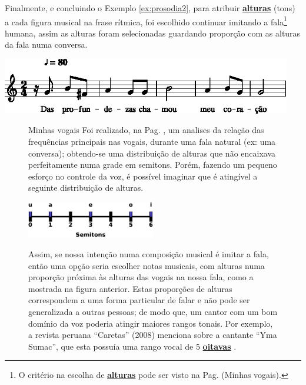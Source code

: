 \begin{example}
\label{ex:prosodia3}
Finalmente, e concluindo o Exemplo \ref{ex:prosodia2}, 
para atribuir \hyperref[sec:pos:Altura]{\textbf{alturas}} (tons) a cada figura musical na frase rítmica, 
foi escolhido continuar imitando a fala\footnote{O 
critério na escolha de \hyperref[sec:pos:Altura]{\textbf{alturas}} pode ser visto na Pag. \pageref{ref:minhasvogais} (Minhas vogais).}
humana,
assim as alturas foram selecionadas guardando proporção com as alturas da fala numa conversa.
\begin{center}
\href{https://drive.google.com/file/d/1LshTD9MsnL2LU70VyLBLKnlghprm0x8P/view?usp=sharing}{\includegraphics[width=0.95\textwidth]{chapters/cap-musica-topicos/frase5-1.eps}}
\end{center}
\end{example}

\begin{figure}[!ht]
\begin{elaboracion}{Minhas vogais}
Foi realizado, na Pag. \pageref{fig:timbresvocais}, um analises da relação das frequências principais nas vogais,
durante uma fala natural (ex: uma conversa);
obtendo-se uma distribuição de alturas que não encaixava perfeitamente numa grade em semitons.
Porém, fazendo um pequeno esforço no controle da voz, 
é possível imaginar que é atingível a seguinte distribuição de alturas.
\begin{center}
\includegraphics[width=0.50\textwidth]{chapters/cap-musica-topicos/vocales-semitons2.eps}
\end{center}
Assim, se nossa intenção numa composição musical é imitar a fala, 
então uma opção seria escolher notas musicais, 
com alturas numa proporção próxima às alturas das vogais na nossa fala, 
como a mostrada na figura anterior.
Estas proporções de alturas correspondem a uma forma particular de falar e não pode ser generalizada a outras pessoas;
de modo que, um cantor com um bom domínio da voz poderia atingir maiores rangos tonais.
Por exemplo, a revista peruana ``Caretas'' (2008)  menciona sobre a cantante ``Yma Sumac'',
que esta possuía uma rango vocal de 5 \hyperref[sec:pos:Oitava]{\textbf{oitavas}} \cite[pp. 73]{2008caretas}.  
\end{elaboracion}
\label{ref:minhasvogais}
\end{figure}






